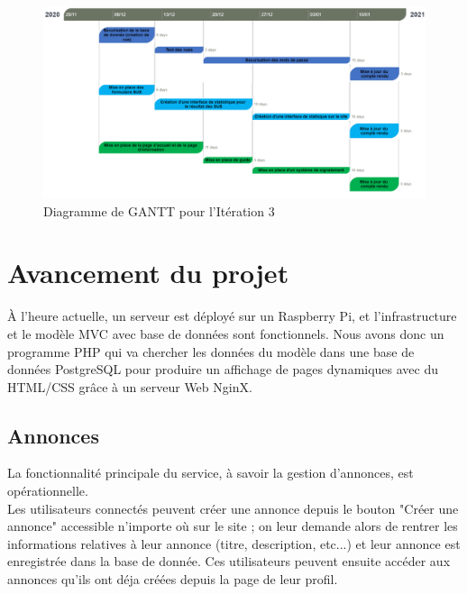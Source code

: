 \documentclass[a4paper,11pt]{article}
\begin{document}
\begin{figure}[H]
  \includegraphics[width=\linewidth]{images/gantt-iteration3.png}
  \caption{Diagramme de GANTT pour l'Itération 3}
  \label{fig:gantt-iteration3}
\end{figure}



\section{Avancement du projet}

À l'heure actuelle, un serveur est déployé sur un Raspberry Pi, et l'infrastructure et le modèle MVC
avec base de données sont fonctionnels. Nous avons donc un programme PHP qui va chercher les
données du modèle dans une base de données PostgreSQL pour produire un affichage de pages
dynamiques avec du HTML/CSS grâce à un serveur Web NginX.\\



\subsection{Annonces}

La fonctionnalité principale du service, à savoir la gestion d'annonces, est opérationnelle.\\

Les utilisateurs connectés peuvent créer une annonce depuis le bouton "Créer une annonce" accessible n'importe où sur le site ; on leur demande alors de rentrer les informations relatives à leur annonce (titre, description, etc...) et leur annonce est enregistrée dans la base de donnée. Ces utilisateurs peuvent ensuite accéder aux annonces qu'ils ont déja créées depuis la page de leur profil.\\
\end{document}
